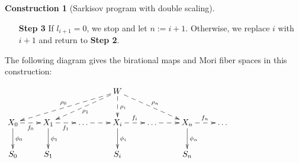 \documentclass[11pt]{amsart}
\numberwithin{equation}{section}
\newcommand{\Mm}{{\bf{M}}}
\newcommand{\Qq}{\mathbb{Q}}
\newcommand{\Rr}{\mathbb{R}}
\theoremstyle{definition}
\theoremstyle{definition}
\newtheorem{cons}[thm]{Construction}
\theoremstyle{definition}
\begin{document}
\begin{cons}[Sarkisov program with double scaling]
\begin{itemize}
\begin{itemize}
        \item a $\Qq$-factorial lc g-pair $(X_{i+1},B_{i+1}+M_{X_{i+1}})$,
        \item a birational map $\rho_{i+1}: W\dashrightarrow X_{i+1}$,
        \item a $(K_{X_{i+1}}+B_{i+1}+M_{X_{i+1}})$-Mori fiber space$/Z$ $\phi_{i+1}: X_{i+1}\rightarrow S_{i+1}$,
        \item two $\Rr$-Cartier $\Rr$-divisors $L_{i+1}$ and $H_{i+1}$ on $X_{i+1}$, 
            \item two real number $0\leq l_{i+1}\leq l_i$ and $h_i\leq h_{i+1}\leq 1$,
            \item a $\phi_{i+1}$-vertical curve $\Sigma_{i+1}$, 
            \item a real number $r_{i+1}:=\frac{H_{i+1}\cdot\Sigma_{i+1}}{L_{i+1}\cdot\Sigma_{i+1}}$, and
            \item a Sarkisov link$/Z$ $f_i: X_i\dashrightarrow X_{i+1}$ as in \textbf{Case 1}, or \textbf{Case 2.1}, or \textbf{Case 2.2}, or \textbf{Case 3.1}, or \textbf{Case 3.2}, or \textbf{Case 3.3} of Theorem \ref{thm: scaling sarkisov},
    \end{itemize}
    such that
     \begin{itemize}
        \item $(W,B_W+l_{i+1}L_W+h_{i+1}H_W,\Mm)\geq (X_{i+1},B_{i+1}+l_{i+1}L_{i+1}+h_{i+1}H_{i+1},\Mm)$,
        \item $B_{i+1},L_{i+1}$ and $H_{i+1}$ are the birational transforms of $B_{i},L_{i}$ and $H_{i}$ on $X_{i+1}$ respectively,
        \item $K_{X_{i+1}}+B_{i+1}+l_{i+1}L_{i+1}+h_{i+1}H_{i+1}+M_{X_{i+1}}\sim_{\Rr,S_{i+1}}0$, 
        \item $K_{X_{i+1}}+B_{i+1}+l_{i+1}L_{i+1}+h_{i+1}H_{i+1}+M_{X_{i+1}}$ is nef$/Z$, and
        \item $r_i\geq r_{i+1}>0$.
    \end{itemize}
    Notice that the assumptions hold when $i=0$.
\item[\textbf{Step 3}] If $l_{i+1}=0$, we stop and let $n:=i+1$. Otherwise, we replace $i$ with $i+1$ and return to \textbf{Step 2}.
\end{itemize}
The following diagram gives the birational maps and Mori fiber spaces in this construction:
\begin{center}$\xymatrix{
 & & &W\ar@{-->}[dlll]_{\rho_0}\ar@{-->}[dll]^{\rho_1}\ar@{-->}[d]^{\rho_i}\ar@{-->}[drr]^{\rho_n}& & & \\
      X_0 \ar@{-->}[r]_{f_0}\ar@{->}[d]^{\phi_0}&X_1\ar@{-->}[r]_{f_1}\ar@{->}[d]^{\phi_1}&\dots\ar@{-->}[r]&X_i\ar@{-->}[r]^{f_i}\ar@{->}[d]^{\phi_i}&\dots\ar@{-->}[r]&X_n\ar@{->}[d]^{\phi_n}\ar@{-->}[r]^{f_n}& \dots \\
    S_0 & S_1 & & S_i& &S_n & }$
\end{center}
\end{cons}
\end{document}
